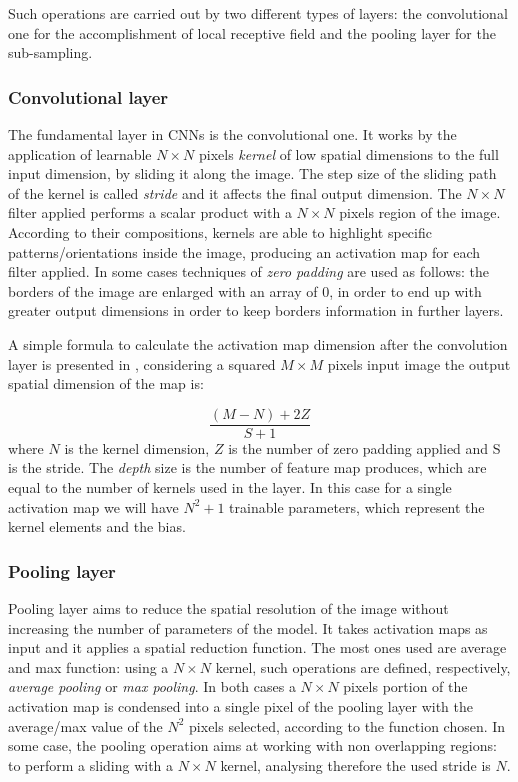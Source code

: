 \documentclass[../main.tex]{subfiles}
\begin{document}
Such operations are carried out by two different types of layers: the convolutional one for the accomplishment of local receptive field and the pooling layer for the sub-sampling.

\subsubsection{Convolutional layer}

The fundamental layer in CNNs is the convolutional one. It works by the application of learnable $N\times N$ pixels \textit{kernel} of low spatial dimensions to the full input dimension, by sliding it along the image.
The step size of the sliding path of the kernel is called \textit{stride} and it affects the final output dimension.
The $N\times N$ filter applied  performs a scalar product with a $N\times N$ pixels region of the image.
According to their compositions, kernels are able to highlight specific patterns/orientations inside the image, producing an activation map for each filter applied. 
In some cases techniques of  \textit{zero padding} are used as follows: the borders of the image are enlarged with an array of $0$, in order to end up with greater output dimensions in order to keep borders information in further layers.


A simple formula to calculate the activation map dimension after the convolution layer is presented in \cite{o2015introduction-cnn}, considering a squared $M\times M$ pixels input image the output spatial dimension of the map is:

\begin{equation}
    \frac{(M-N)+2Z}{S+1}
\end{equation}
where $N$ is the kernel dimension, $Z$ is the number of zero padding applied and S is the stride. The \textit{depth} size is the number of feature map produces, which are equal to the number of kernels used in the layer. In this case for a single activation map we will have $N^2 + 1$ trainable parameters, which represent the kernel elements and the bias.

\subsubsection{Pooling layer}

Pooling layer aims to reduce the spatial resolution of the image without increasing the number of parameters of the model. 
It takes activation maps as input and it applies a spatial reduction function. 
The most ones used are average and max function: using a $N\times N$ kernel, such operations are defined, respectively, \textit{average pooling} or \textit{max pooling}.
In both cases a $N\times N$ pixels portion of the activation map is condensed into a single pixel of the pooling layer with the average/max value of the $N^2$ pixels selected, according to the function chosen.
In some case, the pooling operation aims at working with non overlapping regions: to perform a sliding with a $N\times N$ kernel, analysing therefore the used stride is $N$.
\end{document}
